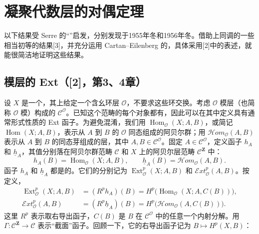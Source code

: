 \chapter{凝聚代数层的对偶定理}
\providecommand{\dHom}{\mathcal{H}\!om}
\providecommand{\dExt}{\mathcal{E}\!xt}
\providecommand{\dTor}{\mathcal{T}\!or}
\providecommand{\dOO}{\mathcal{O}}
以下结果受 Serre 的“”启发，分别发现于1955年冬和1956年冬。借助上同调的一些相当初等的结果[3]，并充分运用 Cartan--Eilenberg 的，具体采用[2]中的表述，就能很简洁地证明这些结果。

\section{模层的 Ext（[2]，第3、4章）}
设 $X$ 是一个，其上给定一个含幺环层 $\dOO$，不要求这些环交换。考虑 $\dOO$ 模层（也简称 $\dOO$ 模）构成的 $\mathcal C^{\dOO}$。已知这个范畴的每个对象都有，因此可以在其中定义具有通常形式性质的 Ext 函子。为避免混淆，我们用 $\operatorname{Hom}_{\dOO}(X;A,B)$，或简记 $\operatorname{Hom}(X;A,B)$，表示从 $A$ 到 $B$ 的 $\dOO$ 同态组成的阿贝尔群；用 $\dHom_{\dOO}(A,B)$ 表示从 $A$ 到 $B$ 的同态芽组成的层，其中 $A,B\in\mathcal C^{\dOO}$。固定 $A\in\mathcal C^{\dOO}$，定义函子 $h_A$ 和 $\underline h_A$，其值分别落在阿贝尔群范畴 $\mathcal C$ 和 $X$ 上的阿贝尔层范畴 $\mathcal C^{\mathbf Z}$ 中：
\begin{equation}
h_A(B)=\operatorname{Hom}_{\dOO}(X;A,B),\qquad
\underline h_A(B)=\dHom_{\dOO}(A,B).
\tag{1.1}\label{d-1.1}
\end{equation}
函子 $h_A$ 和 $\underline h_A$ 都是的。它们的分别记为 $\operatorname{Ext}_{\dOO}^{p}(X;A,B)$ 和 $\dExt_{\dOO}^{p}(A,B)$。按定义，
\begin{equation}
\begin{aligned}
\operatorname{Ext}_{\dOO}^{p}(X;A,B)
&=(R^ph_A)(B)=H^p\bigl(\operatorname{Hom}_{\dOO}(X;A,C(B))\bigr),\\
\dExt_{\dOO}^{p}(A,B)
&=(R^p\underline h_A)(B)=H^p\bigl(\dHom_{\dOO}(A,C(B))\bigr).
\end{aligned}\tag{1.2}\label{d-1.2}
\end{equation}
这里 $R^p$ 表示取右导出函子，$C(B)$ 是 $B$ 在 $\mathcal C^{\dOO}$ 中的任意一个内射分解。用 $\Gamma:\mathcal C^{\mathbf Z}\to\mathcal C$ 表示“截面”函子。回顾一下，它的右导出函子记为 $B\mapsto H^p(X,B)$：

